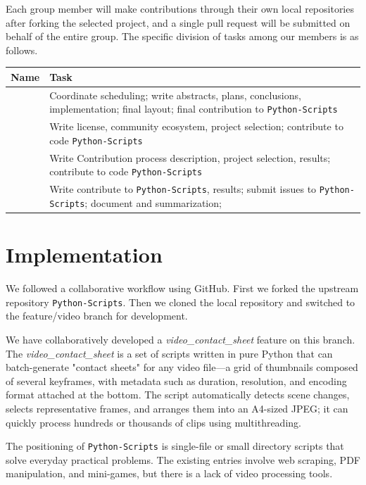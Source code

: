 \documentclass[12pt]{article}
\begin{document}
Each group member will make contributions through their own local repositories after forking the selected project, and a single pull request will be submitted on behalf of the entire group. The specific division of tasks among our members is as follows.
\vspace{1em}
\begin{longtable}{|p{3cm}|p{10cm}|}
\hline
\textbf{Name} & \textbf{Task} \\
\hline
 & Coordinate scheduling; write abstracts, plans, conclusions, implementation; final layout; final contribution to \texttt{Python-Scripts} \\
\hline
 & Write license, community ecosystem, project selection; contribute to code \texttt{Python-Scripts} \\
\hline
 & Write Contribution process description, project selection, results; contribute to code \texttt{Python-Scripts} \\
\hline
 & Write contribute to \texttt{Python-Scripts}, results; submit issues to \texttt{Python-Scripts}; document and summarization; \\
\hline
\end{longtable}

\section{Implementation}

We followed a collaborative workflow using GitHub. First we forked the upstream repository \texttt{Python-Scripts}.
Then we cloned the local repository and switched to the feature/video branch for development.

We have collaboratively developed a \textit{video\_contact\_sheet} feature on this branch. The \textit{video\_contact\_sheet} is a set of scripts written in pure Python that can batch-generate "contact sheets" for any video file—a grid of thumbnails composed of several keyframes, with metadata such as duration, resolution, and encoding format attached at the bottom. The script automatically detects scene changes, selects representative frames, and arranges them into an A4-sized JPEG; it can quickly process hundreds or thousands of clips using multithreading. 

The positioning of \texttt{Python-Scripts} is single-file or small directory scripts that solve everyday practical problems. The existing entries involve web scraping, PDF manipulation, and mini-games, but there is a lack of video processing tools.
\end{document}

